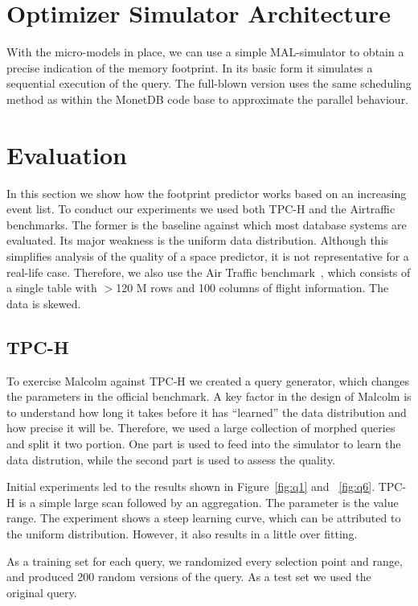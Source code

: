 \documentclass[conference]{IEEEtran}
\begin{document}
\section{Optimizer Simulator Architecture}
With the micro-models in place, we can use a simple MAL-simulator to obtain a precise indication of the memory footprint.
In its basic form it simulates a sequential execution of the query.
The full-blown version uses the same scheduling method as within the MonetDB code base to approximate the parallel behaviour.

\section{Evaluation}
In this section we show how the footprint predictor works based on an increasing event list.
To conduct our experiments we used both TPC-H and the Airtraffic benchmarks.
The former is the baseline against which most database systems are evaluated.
Its major weakness is the uniform data distribution.
Although this simplifies analysis of the quality of a space predictor, it is not representative for a real-life case.
Therefore, we also use the Air Traffic benchmark~\cite{airtraffic}, which consists of a single table with $>$120 M rows and 100 columns of flight information.
The data is skewed.

\subsection{TPC-H}
To exercise Malcolm against TPC-H we created a query generator, which changes the parameters in the official benchmark.
A key factor in the design of Malcolm is to understand how long it takes before it has ``learned'' the data distribution and how precise it will be.
Therefore, we used a large collection of morphed queries and split it two portion.
One part is used to feed into the simulator to learn the data distrution, while the second part is used to assess the quality.

Initial experiments led to the results shown in Figure~\ref{fig:q1} and ~\ref{fig:q6}.
TPC-H is a simple large scan followed by an aggregation. 
The parameter is the value range.
The experiment shows a steep learning curve, which can be attributed to the uniform distribution.
However, it also results in a little over fitting.

As a training set for each query, we randomized every selection point and range, and produced 200 random versions of the query.
As a test set we used the original query.
\end{document}
